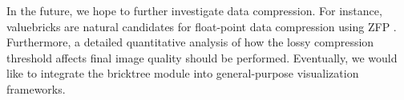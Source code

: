 
In the future, we hope to further investigate data compression.  
For instance, valuebricks are natural candidates for float-point data compression using ZFP
\cite{lindstrom2014fixed}.
Furthermore, a detailed quantitative analysis of how the lossy compression
threshold affects final image quality should be performed. 
Eventually, we would like to integrate the bricktree module into
general-purpose visualization frameworks. 





%

%
%
%




